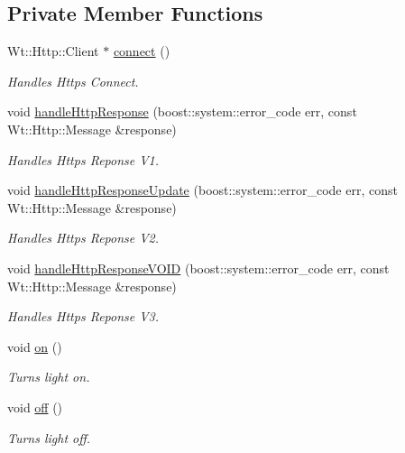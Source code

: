 \subsection*{Private Member Functions}
\begin{DoxyCompactItemize}
\item 
Wt\+::\+Http\+::\+Client $\ast$ \hyperlink{classGroupsSchedulerControlWidget_a955faa95f33e54162ab4f0f80a098ec8}{connect} ()
\begin{DoxyCompactList}\small\item\em Handles Https Connect. \end{DoxyCompactList}\item 
void \hyperlink{classGroupsSchedulerControlWidget_a792d4425d72eb99afbed972c0799b273}{handle\+Http\+Response} (boost\+::system\+::error\+\_\+code err, const Wt\+::\+Http\+::\+Message \&response)
\begin{DoxyCompactList}\small\item\em Handles Https Reponse V1. \end{DoxyCompactList}\item 
void \hyperlink{classGroupsSchedulerControlWidget_a435f968223e3fa849290a500f7dae79f}{handle\+Http\+Response\+Update} (boost\+::system\+::error\+\_\+code err, const Wt\+::\+Http\+::\+Message \&response)
\begin{DoxyCompactList}\small\item\em Handles Https Reponse V2. \end{DoxyCompactList}\item 
void \hyperlink{classGroupsSchedulerControlWidget_aa62abc1e4341919ae6c58a1cc0780051}{handle\+Http\+Response\+V\+O\+ID} (boost\+::system\+::error\+\_\+code err, const Wt\+::\+Http\+::\+Message \&response)
\begin{DoxyCompactList}\small\item\em Handles Https Reponse V3. \end{DoxyCompactList}\item 
void \hyperlink{classGroupsSchedulerControlWidget_a6851a79e55eb93900d0a9873adf29b96}{on} ()
\begin{DoxyCompactList}\small\item\em Turns light on. \end{DoxyCompactList}\item 
void \hyperlink{classGroupsSchedulerControlWidget_a3ab5a7846740af53524a36dbd9de0063}{off} ()
\begin{DoxyCompactList}\small\item\em Turns light off. \end{DoxyCompactList}\item 

\end{DoxyCompactItemize}
